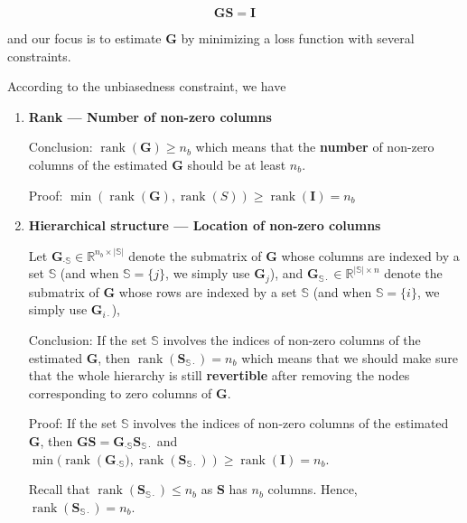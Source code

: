 \documentclass[
  letterpaper,
  DIV=11,
  numbers=noendperiod]{scrartcl}
\begin{document}
\[
\boldsymbol{G}\boldsymbol{S} = \boldsymbol{I}
\]

and our focus is to estimate \(\boldsymbol{G}\) by minimizing a loss
function with several constraints.

According to the unbiasedness constraint, we have

\begin{enumerate}
\def\labelenumi{\arabic{enumi}.}
\item
  \textbf{Rank --- Number of non-zero columns}

  Conclusion: \(\operatorname{rank}(\boldsymbol{G}) \geq n_b\) which
  means that the \textbf{number} of non-zero columns of the estimated
  \(\boldsymbol{G}\) should be at least \(n_b\).

  Proof:
  \(\min (\operatorname{rank}(\boldsymbol{G}), \operatorname{rank}(S)) \geq \operatorname{rank}(\boldsymbol{I})=n_b\)
\item
  \textbf{Hierarchical structure --- Location of non-zero columns}

  Let
  \(\boldsymbol{G}_{\cdot \mathbb{S}} \in \mathbb{R}^{n_b \times |\mathbb{S}|}\)
  denote the submatrix of \(\boldsymbol{G}\) whose columns are indexed
  by a set \(\mathbb{S}\) (and when \(\mathbb{S} = \{j\}\), we simply
  use \(\boldsymbol{G}_{j}\)), and
  \(\boldsymbol{G}_{\mathbb{S}\cdot} \in \mathbb{R}^{|\mathbb{S}| \times n}\)
  denote the submatrix of \(\boldsymbol{G}\) whose rows are indexed by a
  set \(\mathbb{S}\) (and when \(\mathbb{S} = \{i\}\), we simply use
  \(\boldsymbol{G}_{i\cdot}\)),

  Conclusion: If the set \(\mathbb{S}\) involves the indices of non-zero
  columns of the estimated \(\boldsymbol{G}\), then
  \(\operatorname{rank}(\boldsymbol{S}_{\mathbb{S}\cdot}) = n_b\) which
  means that we should make sure that the whole hierarchy is still
  \textbf{revertible} after removing the nodes corresponding to zero
  columns of \(\boldsymbol{G}\).

  Proof: If the set \(\mathbb{S}\) involves the indices of non-zero
  columns of the estimated \(\boldsymbol{G}\), then
  \(\boldsymbol{G}\boldsymbol{S} = \boldsymbol{G}_{\cdot \mathbb{S}}\boldsymbol{S}_{\mathbb{S}\cdot}\)
  and
  \(\min (\operatorname{rank}\left(\boldsymbol{G}_{\cdot \mathbb{S}}), \operatorname{rank}(\boldsymbol{S}_{\mathbb{S}\cdot})\right) \geq \operatorname{rank}(\boldsymbol{I})=n_b\).

  Recall that
  \(\operatorname{rank}(\boldsymbol{S}_{\mathbb{S}\cdot}) \leq n_b\) as
  \(\boldsymbol{S}\) has \(n_b\) columns. Hence,
  \(\operatorname{rank}(\boldsymbol{S}_{\mathbb{S}\cdot}) = n_b\).
\end{enumerate}
\end{document}
